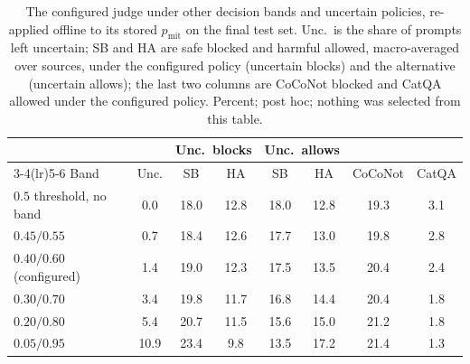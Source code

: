\documentclass[journal]{IEEEtran}
\begin{document}
\setcounter{table}{7}
\begin{table}[h]
\caption{The configured judge under other decision bands and uncertain
policies, re-applied offline to its stored $p_{\mathrm{mit}}$ on the final test
set. Unc.\ is the share of prompts left uncertain; SB and HA are safe blocked
and harmful allowed, macro-averaged over sources, under the configured policy
(uncertain blocks) and the alternative (uncertain allows); the last two columns
are CoCoNot blocked and CatQA allowed under the configured policy. Percent;
post hoc; nothing was selected from this table.}
\label{abr:tab:judgeband}
\centering
\scriptsize
\setlength{\tabcolsep}{3pt}
\begin{tabular}{@{}lccccccc@{}}
\toprule
& & \multicolumn{2}{c}{Unc.\ blocks} & \multicolumn{2}{c}{Unc.\ allows} & & \\
\cmidrule(lr){3-4}\cmidrule(lr){5-6}
Band & Unc. & SB & HA & SB & HA & CoCoNot & CatQA \\
\midrule
$0.5$ threshold, no band & 0.0 & 18.0 & 12.8 & 18.0 & 12.8 & 19.3 & 3.1 \\
$0.45/0.55$ & 0.7 & 18.4 & 12.6 & 17.7 & 13.0 & 19.8 & 2.8 \\
$0.40/0.60$ (configured) & 1.4 & 19.0 & 12.3 & 17.5 & 13.5 & 20.4 & 2.4 \\
$0.30/0.70$ & 3.4 & 19.8 & 11.7 & 16.8 & 14.4 & 20.4 & 1.8 \\
$0.20/0.80$ & 5.4 & 20.7 & 11.5 & 15.6 & 15.0 & 21.2 & 1.8 \\
$0.05/0.95$ & 10.9 & 23.4 & 9.8 & 13.5 & 17.2 & 21.4 & 1.3 \\
\bottomrule
\end{tabular}
\end{table}
\end{document}
